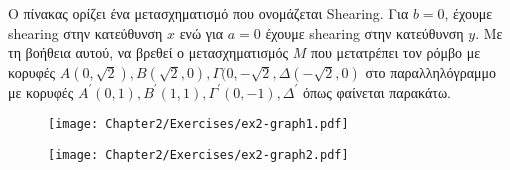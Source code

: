 \begin{exercise}
	Ο πίνακας ορίζει ένα μετασχηματισμό που ονομάζεται Shearing. Για $b = 0$, έχουμε shearing στην κατεύθυνση $x$ ενώ για $a=0$ έχουμε shearing στην κατεύθυνση $y$. Με τη βοήθεια αυτού, να βρεθεί ο μετασχηματισμός $M$ που μετατρέπει τον ρόμβο με κορυφές $A (0, \sqrt{2}), B(\sqrt{2},0), \Gamma (0, -\sqrt{2}, \Delta(-\sqrt{2},0)$ στο παραλληλόγραμμο με κορυφές $A^{'} (0,1), B^{'} (1,1), \Gamma^{'}(0,-1), \Delta^{'}$ όπως φαίνεται παρακάτω.

\begin{figure}[h!]
	\begin{center}
		\begin{minipage}[b]{0.4\textwidth} %
		    \texttt{[image: Chapter2/Exercises/ex2-graph1.pdf]}
		\end{minipage}%
	\hfill
		\begin{minipage}[b]{0.4\textwidth} %
		    \texttt{[image: Chapter2/Exercises/ex2-graph2.pdf]}
		\end{minipage}
	\end{center}
\end{figure}	
	
\end{exercise}


